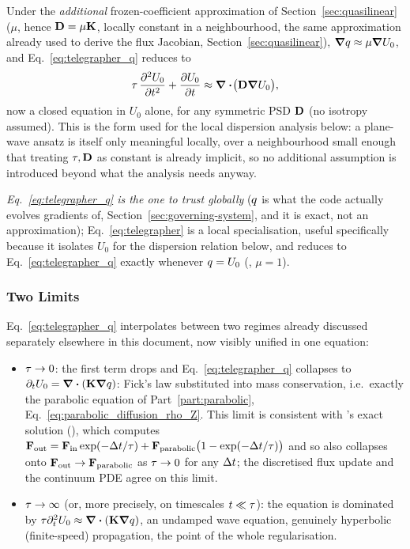 \begin{corollary}
\label{cor:telegrapher_local}
Under the \emph{additional} frozen-coefficient approximation of
Section~\ref{sec:quasilinear} ($\mu$, hence $\mathbf{D}=\mu\mathbf{K}$, locally
constant in a neighbourhood, the same approximation already used to
derive the flux Jacobian, Section~\ref{sec:quasilinear}), $\grad q
\approx\mu\grad U_0$, and Eq.~\eqref{eq:telegrapher_q} reduces to
\begin{equation}
  \label{eq:telegrapher}
  \tau\,\pdv[2]{U_0}{t} + \pdv{U_0}{t} \approx \div\!\big(\mathbf{D}\grad U_0\big) ,
\end{equation}
now a closed equation in $U_0$ alone, for any symmetric PSD $\mathbf{D}$ (no
isotropy assumed). This is the form used for the local dispersion analysis
below: a plane-wave ansatz is itself only meaningful locally, over a
neighbourhood small enough that treating $\tau,\mathbf{D}$ as constant is
already implicit, so no additional assumption is introduced beyond what
the analysis needs anyway.
\end{corollary}
\emph{Eq.~\eqref{eq:telegrapher_q} is the one to trust globally}
($q$ is what the code actually evolves gradients of,
Section~\ref{sec:governing-system}, and it is exact, not an
approximation); Eq.~\eqref{eq:telegrapher} is a local specialisation,
useful specifically because it isolates $U_0$ for the dispersion relation
below, and reduces to Eq.~\eqref{eq:telegrapher_q} exactly whenever
$q=U_0$ (, $\mu=1$).

\subsubsection{Two Limits}
Eq.~\eqref{eq:telegrapher_q} interpolates between two regimes already
discussed separately elsewhere in this document, now visibly unified in
one equation:
\begin{itemize}
\item $\tau\to0$: the first term drops and
  Eq.~\eqref{eq:telegrapher_q} collapses to
  $\partial_tU_0=\div(\mathbf{K}\grad q)$: Fick's law substituted into
  mass conservation, i.e.\ exactly the parabolic equation of
  Part~\ref{part:parabolic}, Eq.~\eqref{eq:parabolic_diffusion_rho_Z}.
  This limit is consistent with
  's exact solution
  (), which computes
  $\mathbf{F}_{\rm out}=\mathbf{F}_{\rm in}\exp(-\Delta t/\tau)+\mathbf{F}_{\rm
  parabolic}\big(1-\exp(-\Delta t/\tau)\big)$ and so also collapses onto
  $\mathbf{F}_{\rm out}\to\mathbf{F}_{\rm parabolic}$ as $\tau\to0$ for any
  $\Delta t$; the discretised flux update and the continuum PDE agree on
  this limit.
\item $\tau\to\infty$ (or, more precisely, on timescales
  $t\ll\tau$): the equation is dominated by
  $\tau\partial_t^2U_0\approx\div(\mathbf{K}\grad q)$, an
  undamped wave equation, genuinely hyperbolic (finite-speed)
  propagation, the point of the whole regularisation.
\end{itemize}

